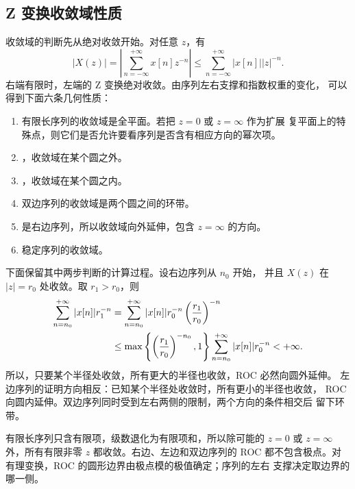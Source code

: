\subsection{Z 变换收敛域性质}
\label{subsec:z-transform-roc-properties}

收敛域的判断先从绝对收敛开始。对任意 $z$，有
\begin{equation}
  \left|X(z)\right|
  =\left|\sum_{n=-\infty}^{+\infty}x[n]z^{-n}\right|
  \leq\sum_{n=-\infty}^{+\infty}|x[n]||z|^{-n}.
  \label{eq:z-transform-absolute-convergence}
\end{equation}
右端有限时，左端的 Z 变换绝对收敛。由序列左右支撑和指数权重的变化，
可以得到下面六条几何性质：

\begin{enumerate}[label=\arabic*., leftmargin=2.4em]
  \item 有限长序列的收敛域是全平面。若把 $z=0$ 或 $z=\infty$ 作为扩展
    复平面上的特殊点，则它们是否允许要看序列是否含有相应方向的幂次项。
  \item {}，收敛域在某个圆之外。
  \item {}，收敛域在某个圆之内。
  \item 双边序列的收敛域是两个圆之间的环带。
  \item {}是右边序列，所以收敛域向外延伸，包含 $z=\infty$ 的方向。
  \item 稳定序列的收敛域。
\end{enumerate}

下面保留其中两步判断的计算过程。设右边序列从 $n_0$ 开始，
并且 $X(z)$ 在 $|z|=r_0$ 处收敛。取 $r_1>r_0$，则
\begin{align}
  \sum_{n=n_0}^{+\infty}|x[n]|r_1^{-n}
  &=\sum_{n=n_0}^{+\infty}
    |x[n]|r_0^{-n}\left(\frac{r_1}{r_0}\right)^{-n} \notag\\
  &\leq
    \max\left\{\left(\frac{r_1}{r_0}\right)^{-n_0},1\right\}
    \sum_{n=n_0}^{+\infty}|x[n]|r_0^{-n}
  <+\infty.
  \label{eq:z-transform-right-roc-proof}
\end{align}
所以，只要某个半径处收敛，所有更大的半径也收敛，ROC 必然向圆外延伸。
左边序列的证明方向相反：已知某个半径处收敛时，所有更小的半径也收敛，
ROC 向圆内延伸。双边序列同时受到左右两侧的限制，两个方向的条件相交后
留下环带。

有限长序列只含有限项，级数退化为有限项和，所以除可能的 $z=0$ 或
$z=\infty$ 外，所有有限非零 $z$ 都收敛。右边、左边和双边序列的 ROC
都不包含极点。对有理变换，ROC 的圆形边界由极点模的极值确定；序列的左右
支撑决定取边界的哪一侧。

